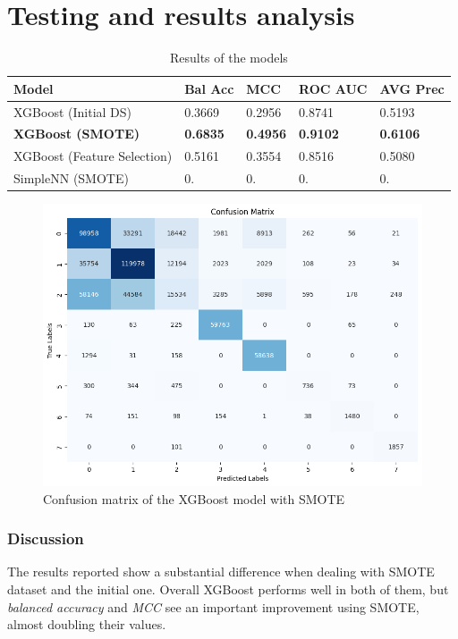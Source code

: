\documentclass[10pt,twocolumn,letterpaper]{article}
\begin{document}
\section{Testing and results analysis}
\begin{table}[h!]
    \centering
    \begin{tabular}{|p{1.6cm}|p{1.2cm}|p{1.2cm}|p{1.2cm}|p{1.2cm}|}
    \hline
    \textbf{Model} & \textbf{Bal Acc} & \textbf{MCC} & \textbf{ROC AUC} & \textbf{AVG Prec} \\
    \hline
    XGBoost (Initial DS) & 0.3669 & 0.2956 & 0.8741 & 0.5193 \\
    \hline
    \textbf{XGBoost (SMOTE)} & \textbf{0.6835} & \textbf{0.4956} & \textbf{0.9102} & \textbf{0.6106} \\
    \hline
    XGBoost (Feature Selection) & 0.5161 & 0.3554 & 0.8516 & 0.5080 \\
    \hline
    SimpleNN (SMOTE) & 0. & 0. & 0. & 0. \\ %
    \hline
    \end{tabular}
    \caption{Results of the models}
    \label{tab:results}
\end{table}
\begin{center}
    \begin{figure}[h!]
        \centering
        \includegraphics[scale=0.4]{img/cmXGBoostSMOTE.png}
        \caption{Confusion matrix of the XGBoost model with SMOTE}
        \label{fig:cmXGBoostSMOTE}
    \end{figure}
\end{center}

\subsubsection{Discussion}
The results reported show a substantial difference when dealing with SMOTE\cite{chawla2002smote} dataset and the initial one. Overall XGBoost performs well in both of them, but \textit{balanced accuracy} and \textit{MCC} see an important improvement using SMOTE, almost doubling their values. 
\end{document}
